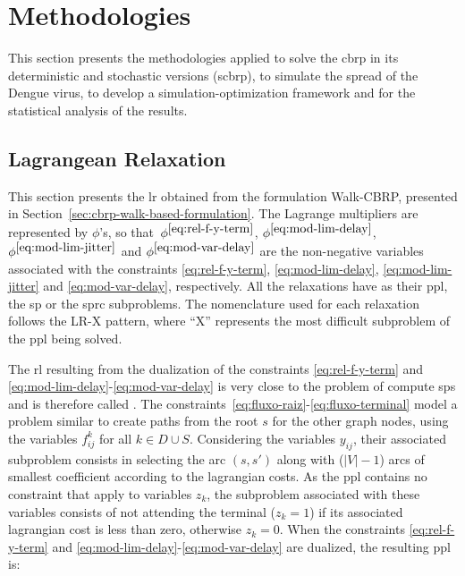 \chapter{Methodologies}\label{chap:methodologies}

This section presents the methodologies applied to solve the \gls{cbrp} in its deterministic and stochastic versions (\gls{scbrp}),
to simulate the spread of the Dengue virus, to develop a simulation-optimization framework
and for the statistical analysis of the results.

\section{Lagrangean Relaxation}\label{sec:lagrangean-relaxation}



\newcommand{\mult}[2]{\ensuremath{\phi^{#1}_{#2}}}

This section presents the \gls{lr} obtained from the formulation Walk-CBRP, presented in
Section~\ref{sec:cbrp-walk-based-formulation}. The Lagrange multipliers
are   represented    by   $\phi$'s,    so   that~\mult{\ref{eq:rel-f-y-term}}{},
\mult{\ref{eq:mod-lim-delay}}{},       \mult{\ref{eq:mod-lim-jitter}}{}      and
\mult{\ref{eq:mod-var-delay}}{} are  the non-negative variables  associated with
the      constraints     \eqref{eq:rel-f-y-term},      \eqref{eq:mod-lim-delay},
\eqref{eq:mod-lim-jitter}  and \eqref{eq:mod-var-delay},  respectively. All  the
relaxations have as their \gls{ppl}, the \gls{sp} or the \gls{sprc} subproblems.
The nomenclature used for each relaxation  follows the LR-X pattern, where ``X''
represents the most difficult subproblem of the \gls{ppl} being solved.

The   \gls{rl}    resulting   from   the   dualization    of   the   constraints
\eqref{eq:rel-f-y-term} and \eqref{eq:mod-lim-delay}-\eqref{eq:mod-var-delay} is
very close to  the problem of compute \gls{sp}s and  is therefore called {\rlu}.
The constraints~\eqref{eq:fluxo-raiz}-\eqref{eq:fluxo-terminal}  model a problem
similar to create paths  from the root $s$ for the other  graph nodes, using the
variables  $f_{ij}^{k}$ for  all $k  \in D  \cup S$.  Considering the  variables
$y_{ij}$, their  associated subproblem consists  in selecting the arc  $(s, s')$
along with  ($|V|-1$) arcs of  smallest coefficient according to  the lagrangian
costs. As  the \gls{ppl} contains no  constraint that apply to  variables $z_k$,
the subproblem  associated with  these variables consists  of not  attending the
terminal  ($z_k =  1$) if  its  associated lagrangian  cost is  less than  zero,
otherwise  $z_k   =  0$.   When  the  constraints   \eqref{eq:rel-f-y-term}  and
\eqref{eq:mod-lim-delay}-\eqref{eq:mod-var-delay}  are  dualized, the  resulting
\gls{ppl} is:



